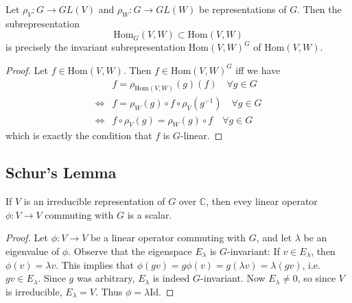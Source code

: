 \begin{frame}
\begin{proposition}
Let  $\rho_V \colon G \to GL(V)$ and $\rho_W \colon G \to GL(W)$ be representations of $G$.  Then the subrepresentation 
\[ \text{Hom}_G (V,W) \subset \text{Hom} (V,W) \]
is precisely the invariant subrepresentation $\text{Hom}(V,W) ^G$ of $\text{Hom}(V,W)$.
\end{proposition}
\begin{proof}
Let $f \in \text{Hom}(V,W)$.  Then $f \in \text{Hom}(V,W) ^G$ iff we have
\begin{align*}
&f = \rho_{\text{Hom}(V,W)} (g)(f)  \quad \forall g \in G \\
\iff &f = \rho_W (g) \circ f \circ \rho_V (g^{-1}) \quad \forall g \in G \\ 
\iff & f \circ \rho_V (g) = \rho_W (g) \circ f \quad \forall g \in G
\end{align*}
which is exactly the condition that $f$ is $G$-linear.
\end{proof}
\end{frame}

\subsection{Schur's Lemma}
\begin{frame}
\begin{theorem} If $V$ is an irreducible representation of $G$ over $\mathbb{C}$, then evey linear operator $\phi \colon V \to V$ commuting with $G$ is a scalar.
\end{theorem}
\begin{proof}
Let $\phi \colon V \to V$  be a linear operator commuting with $G$, and let $\lambda$ be an eigenvalue of $\phi$.  Observe that the eigenspace $E_\lambda$ is $G$-invariant: If $v \in E_\lambda$, then $\phi(v) = \lambda v$.  This implies that $\phi(g v) = g \phi(v) = g (\lambda v) = \lambda (gv)$, i.e. $gv \in E_\lambda$. Since $g$ was arbitrary, $E_\lambda$ is indeed $G$-invariant.  Now $E_\lambda \neq 0$, so since $V$ is irreducible, $E_\lambda = V$.  Thus $\phi = \lambda \text{Id}$.  
\end{proof}
\end{frame}

